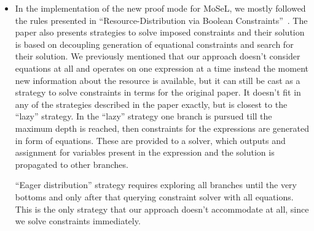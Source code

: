 \begin{itemize}
\item In the implementation of the new proof mode for MoSeL, we mostly followed the rules presented in ``Resource-Distribution via Boolean Constraints''~\cite{harlandResourceDistributionBooleanConstraints2003}.
  The paper also presents strategies to solve imposed constraints and their solution is based on decoupling generation of equational constraints and search for their solution.
  We previously mentioned that our approach doesn't consider equations at all and operates on one expression at a time instead the moment new information about the resource is available, but it can still be cast as a strategy to solve constraints in terms for the original paper.
   It doesn't fit in any of the strategies described in the paper exactly, but is closest to the ``lazy'' strategy.
  In the ``lazy'' strategy one branch is pursued till the maximum depth is reached, then constraints for the expressions are generated in form of equations.
These are provided to a solver, which outputs and assignment for variables present in the expression and the solution is propagated to other branches.

  ``Eager distribution'' strategy requires exploring all branches until the very bottoms and only after that querying constraint solver with all equations.
  This is the only strategy that our approach doesn't accommodate at all, since we solve constraints immediately.


\end{itemize}
